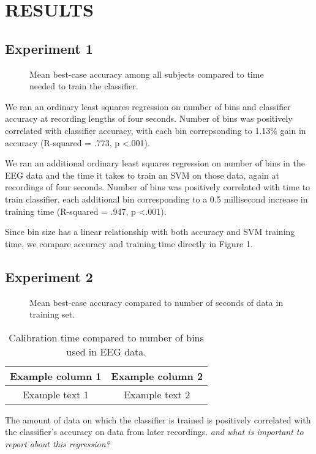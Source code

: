 \section{\uppercase{Results}}

\subsection{Experiment 1}

\begin{figure}[!h]
  \vspace{-0.2cm}
  \centering
   {}
  \caption{Mean best-case accuracy among all subjects compared to time needed to train the classifier.}
  \label{fig:fig1}
  \vspace{-0.1cm}
 \end{figure}

We ran an ordinary least squares regression on number of bins and classifier accuracy at recording lengths of four seconds. Number of bins was positively correlated with classifier accuracy, with each bin correpsonding to 1.13\% gain in accuracy (R-squared = .773, p \textless .001). 

We ran an additional ordinary least squares regression on number of bins in the EEG data and the time it takes to train an SVM on those data, again at recordings of four seconds. Number of bins was positively correlated with time to train classifier, each additional bin corresponding to a 0.5 millisecond increase in training time (R-squared = .947, p \textless .001).

Since bin size has a linear relationship with both accuracy and SVM training time, we compare accuracy and training time directly in Figure 1.


\subsection{Experiment 2}

\begin{figure}[!h]
  \vspace{-0.2cm}
  \centering
   {}
  \caption{Mean best-case accuracy compared to number of seconds of data in training set.}
  \label{fig:fig2}
  \vspace{-0.1cm}
\end{figure}

\begin{table}[h]
\caption{Calibration time compared to number of bins used in EEG data.}\label{tab:example1} \centering
\begin{tabular}{|c|c|}
  \hline
  Example column 1 & Example column 2 \\
  \hline
  Example text 1 & Example text 2 \\
  \hline
\end{tabular}
\end{table}

 The amount of data on which the classifier is trained is positively correlated with the classifier's accuracy on data from later recordings. \textit{and what is important to report about this regression?}
